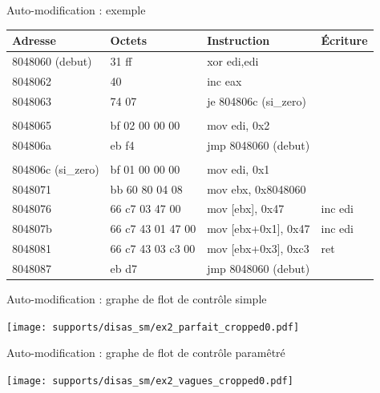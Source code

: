 \documentclass{beamer}
\begin{document}
\begin{frame}{Auto-modification : exemple}
\begin{center}
\begin{tabular}[b]{|l|l|l|l|}
\hline
Adresse & Octets & Instruction & Écriture\\ 
\hline
 8048060 (debut)  &  31 ff             &  xor    edi,edi		& \\
 8048062  &  40                        &  inc    eax			& \\
 8048063  &  74 07                     &  je     804806c (si\_zero) 	& \\
 	  &			       &				& \\
 8048065  &  bf 02 00 00 00            &  mov    edi, 0x2 		& \\
 804806a  &  eb f4                     &  jmp    8048060 (debut) 	& \\
	  &			       &				& \\
 804806c (si\_zero) &  bf 01 00 00 00  &  mov    edi, 0x1 		& \\
 8048071  &  bb 60 80 04 08            &  mov    ebx, 0x8048060 	& \\
 8048076  &  66 c7 03 47 00            &  mov    [ebx], 0x47 		& inc edi\\
 804807b  &  66 c7 43 01 47 00         &  mov    [ebx+0x1], 0x47	& inc edi \\
 8048081  &  66 c7 43 03 c3 00         &  mov    [ebx+0x3], 0xc3	& ret \\
 8048087  &  eb d7                     &  jmp    8048060 (debut) 	& \\
\hline
\end{tabular}
\end{center}
\end{frame}

\begin{frame}{Auto-modification : graphe de flot de contrôle simple}
\begin{center}
 \texttt{[image: supports/disas\_sm/ex2\_parfait\_cropped0.pdf]}
 \end{center}
\end{frame}

\begin{frame}{Auto-modification : graphe de flot de contrôle paramêtré}
\begin{center}
 \texttt{[image: supports/disas\_sm/ex2\_vagues\_cropped0.pdf]}
\end{center}
\end{frame}
\end{document}
